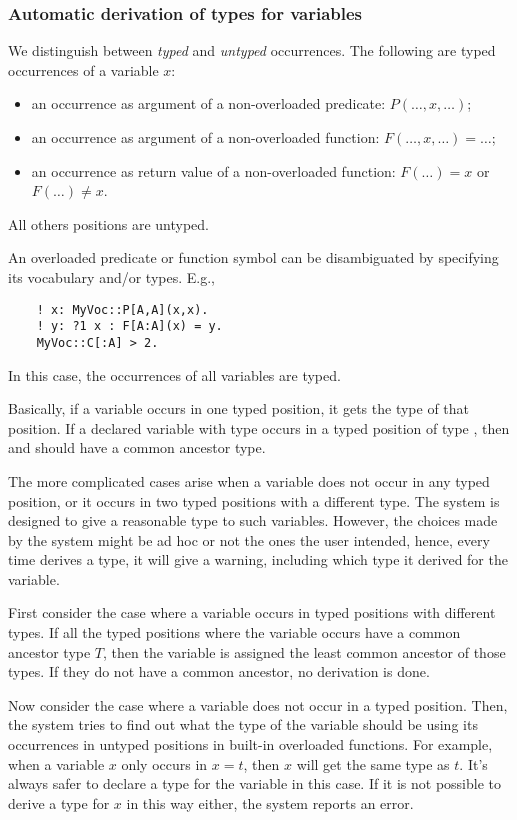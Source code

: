 \subsubsection{Automatic derivation of types for variables}



We distinguish between \emph{typed} and \emph{untyped} occurrences. The following are typed occurrences of a variable $x$:
\begin{itemize}
	\item an occurrence as argument of a non-overloaded predicate: $P(\ldots,x,\ldots)$;
	\item an occurrence as argument of a non-overloaded function: $F(\ldots,x,\ldots) = \ldots$;
	\item an occurrence as return value of a non-overloaded function: $F(\ldots) = x$ or $F(\ldots) \neq x$. 
\end{itemize}

All others positions are untyped. 

An overloaded predicate or function symbol can be disambiguated by specifying its vocabulary and/or types.  E.g.,
\begin{lstlisting}
	! x: MyVoc::P[A,A](x,x).
	! y: ?1 x : F[A:A](x) = y.
	MyVoc::C[:A] > 2.
\end{lstlisting}
In this case, the occurrences of all variables are typed.


Basically, if a variable occurs in one typed position, it gets the type of that position.  
If a declared variable with type  occurs in a typed position of type , then  and  should have a common ancestor type.


The more complicated cases arise when a variable does not occur in any typed position, or it occurs in two typed positions with a different type. The system is designed to give a reasonable type to such variables. However, the choices made by the system might be ad hoc or not the ones the user intended, hence, every time \idp derives a type, it will give a warning, including which type it derived for the variable. 

First consider the case where a variable occurs in typed positions with different types. If all the typed positions where the variable occurs have a common ancestor type $T$, then the variable is assigned the least common ancestor of those types. If they do not have a common ancestor, no derivation is done.

Now consider the case where a variable does not occur in a typed position. Then, the \idp system tries to find out what the type of the variable should be using its occurrences in untyped positions in built-in overloaded functions.  For example, when a variable $x$ only occurs in $x=t$, then $x$ will get the same type as $t$.   It's always safer to declare a type for the variable in this case.  If it is not possible to derive a type for $x$ in this way either, the \idp system reports an error.

